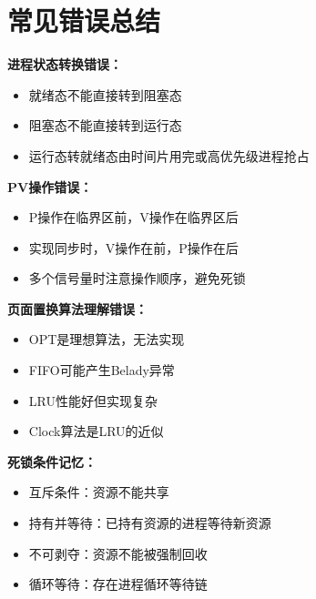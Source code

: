 \documentclass[lang=cn,newtx,10pt,scheme=chinese]{../../elegantbook}
\begin{document}
\section{常见错误总结}

\textbf{进程状态转换错误：}
\begin{itemize}
  \item 就绪态不能直接转到阻塞态
  \item 阻塞态不能直接转到运行态
  \item 运行态转就绪态由时间片用完或高优先级进程抢占
\end{itemize}

\textbf{PV操作错误：}
\begin{itemize}
  \item P操作在临界区前，V操作在临界区后
  \item 实现同步时，V操作在前，P操作在后
  \item 多个信号量时注意操作顺序，避免死锁
\end{itemize}

\textbf{页面置换算法理解错误：}
\begin{itemize}
  \item OPT是理想算法，无法实现
  \item FIFO可能产生Belady异常
  \item LRU性能好但实现复杂
  \item Clock算法是LRU的近似
\end{itemize}

\textbf{死锁条件记忆：}
\begin{itemize}
  \item 互斥条件：资源不能共享
  \item 持有并等待：已持有资源的进程等待新资源
  \item 不可剥夺：资源不能被强制回收
  \item 循环等待：存在进程循环等待链
\end{itemize}

\end{document}
